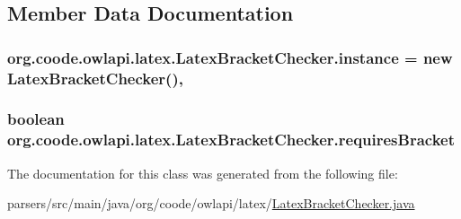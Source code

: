 \subsection{Member Data Documentation}
\hypertarget{classorg_1_1coode_1_1owlapi_1_1latex_1_1_latex_bracket_checker_ad174122690e54df69de03869d4fca8d3}{
\subsubsection[{instance}]{ org.\-coode.\-owlapi.\-latex.\-Latex\-Bracket\-Checker.\-instance = new {\bf Latex\-Bracket\-Checker}()\hspace{0.3cm}{\ttfamily [static]}, {\ttfamily [private]}}}\label{classorg_1_1coode_1_1owlapi_1_1latex_1_1_latex_bracket_checker_ad174122690e54df69de03869d4fca8d3}
\hypertarget{classorg_1_1coode_1_1owlapi_1_1latex_1_1_latex_bracket_checker_a1af27ddbff20f4dc7130d02991fff379}{
\subsubsection[{requires\-Bracket}]{\setlength{\rightskip}{0pt plus 5cm}boolean org.\-coode.\-owlapi.\-latex.\-Latex\-Bracket\-Checker.\-requires\-Bracket\hspace{0.3cm}{\ttfamily [private]}}}\label{classorg_1_1coode_1_1owlapi_1_1latex_1_1_latex_bracket_checker_a1af27ddbff20f4dc7130d02991fff379}


The documentation for this class was generated from the following file\-:\begin{DoxyCompactItemize}
\item 
parsers/src/main/java/org/coode/owlapi/latex/\hyperlink{_latex_bracket_checker_8java}{Latex\-Bracket\-Checker.\-java}\end{DoxyCompactItemize}
